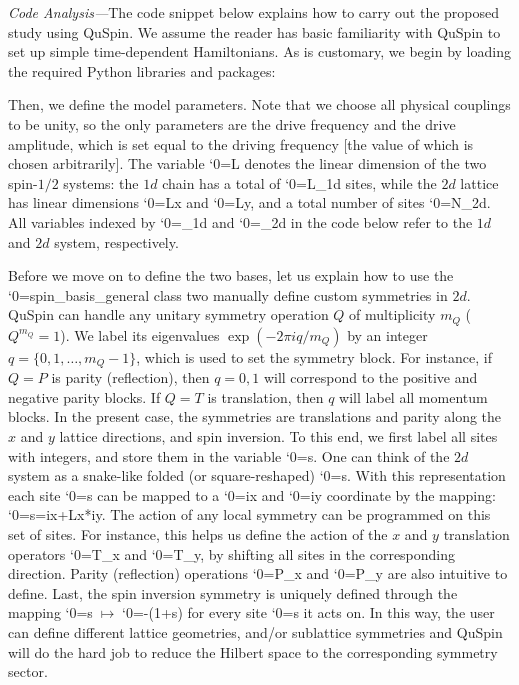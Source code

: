 \documentclass{SciPost}
\newcommand\0{\scalebox{-1}[1]{0}}
\let\svttfamily\ttfamily
\renewcommand\ttfamily{\svttfamily\catcode`0=\active }
\renewcommand\texttt{\bgroup\ttfamily\texttthelp}
\def\texttthelp#1{#1\egroup}
\newcommand{\Spincode}{example9.py}
\begin{document}
\noindent\emph{Code Analysis---}The code snippet below explains how to carry out the proposed study using QuSpin. We assume the reader has basic familiarity with QuSpin to set up simple time-dependent Hamiltonians. As is customary, we begin by loading the required Python libraries and packages:

Then, we define the model parameters. Note that we choose all physical couplings to be unity, so the only parameters are the drive frequency and the drive amplitude, which is set equal to the driving frequency [the value of which is chosen arbitrarily]. The variable \texttt{L} denotes the linear dimension of the two spin-$1/2$ systems: the $1d$ chain has a total of \texttt{L\_1d} sites, while the $2d$ lattice has linear dimensions \texttt{Lx} and \texttt{Ly}, and a total number of sites \texttt{N\_2d}. All variables indexed by \texttt{\_1d} and \texttt{\_2d} in the code below refer to the $1d$ and $2d$ system, respectively. 

Before we move on to define the two bases, let us explain how to use the \texttt{spin\_basis\_general} class two manually define custom symmetries in $2d$. QuSpin can handle any unitary symmetry operation $Q$ of multiplicity $m_Q$ ($Q^{m_Q}=1$). We label its eigenvalues $\exp(-2\pi i q/m_Q)$ by an integer $q=\{0,1,\dots,m_Q-1\}$, which is used to set the symmetry block. For instance, if $Q=P$ is parity (reflection), then $q=0,1$ will correspond to the positive and negative parity blocks. If $Q=T$ is translation, then $q$ will label all momentum blocks. In the present case, the symmetries are translations and parity along the $x$ and $y$ lattice directions, and spin inversion. To this end, we first label all sites with integers, and store them in the variable \texttt{s}. One can think of the $2d$ system as a snake-like folded (or square-reshaped) \texttt{s}. With this representation each site \texttt{s} can be mapped to a \texttt{ix} and \texttt{iy} coordinate by the mapping: \texttt{s=ix+Lx*iy}. The action of any local symmetry can be programmed on this set of sites. For instance, this helps us define the action of the $x$ and $y$ translation operators \texttt{T\_x} and \texttt{T\_y}, by shifting all sites in the corresponding direction. Parity (reflection) operations \texttt{P\_x} and \texttt{P\_y} are also intuitive to define. Last, the spin inversion symmetry is uniquely defined through the mapping \texttt{s}$\;\mapsto\;$\texttt{-(1+s)} for every site \texttt{s} it acts on. In this way, the user can define different lattice geometries, and/or sublattice symmetries and QuSpin will do the hard job to reduce the Hilbert space to the corresponding symmetry sector.
\end{document}
